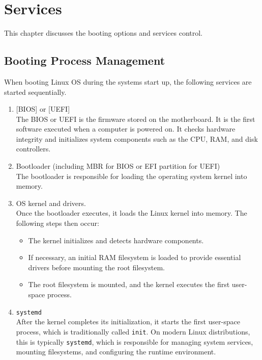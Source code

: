 \chapter{Services}

This chapter discusses the booting options and services control.

\section{Booting Process Management}

When booting Linux OS during the systems start up, the following services are started sequentially.

\begin{enumerate}
  \item {}[BIOS] or [UEFI] \\
  The BIOS or UEFI is the firmware stored on the motherboard. It is the first software executed when a computer is powered on. It checks hardware integrity and initializes system components such as the CPU, RAM, and disk controllers.
  
  \item Bootloader (including MBR for BIOS or EFI partition for UEFI) \\
  The bootloader is responsible for loading the operating system kernel into memory.
  
  \item OS kernel and drivers. \\
  Once the bootloader executes, it loads the Linux kernel into memory. The following steps then occur:
  \begin{itemize}
      \item The kernel initializes and detects hardware components.
      \item If necessary, an initial RAM filesystem is loaded to provide essential drivers before mounting the root filesystem.
      \item The root filesystem is mounted, and the kernel executes the first user-space process.
  \end{itemize}
  
  \item \texttt{systemd} \\
  After the kernel completes its initialization, it starts the first user-space process, which is traditionally called \texttt{init}. On modern Linux distributions, this is typically \texttt{systemd}, which is responsible for managing system services, mounting filesystems, and configuring the runtime environment.
  

\end{enumerate}

